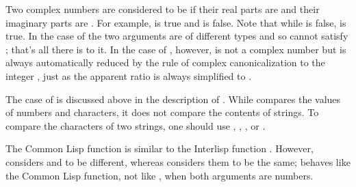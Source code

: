 \begin{defun}[Function]
Two complex numbers are considered to be 
if their real parts are  and their imaginary parts are .
For example,  is true and
 is false.
Note that while  is false,
 is true.
In the case of  the
two arguments are of different types
and so cannot satisfy ; that's all there is to it.
In the case of , however,
 is not a complex number but
is always automatically reduced by the rule of complex
canonicalization to the integer ,
just as the apparent ratio  is always simplified to .

The case of  is discussed above in the description
of .  While  compares the values of numbers and
characters, it does not compare the contents of strings.  To compare
the characters of two strings, one should use , ,
, or .

\beforenoterule
\begin{incompatibility}
The Common Lisp function  is similar to the
Interlisp function .  However,  considers  and
 to be different, whereas  considers them to be the same;
 behaves like the Common Lisp \cd{=} function, not like ,
when both arguments are numbers.
\end{incompatibility}
\afternoterule
\end{defun}

